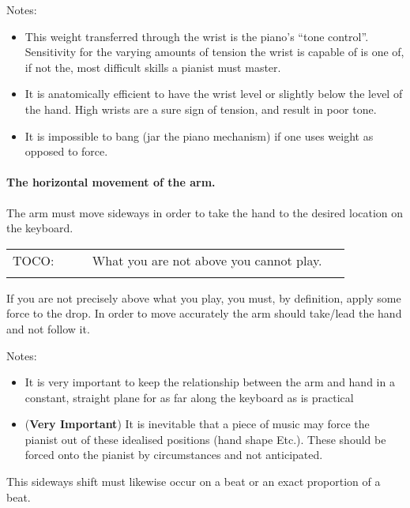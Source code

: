\documentclass{article}
\begin{document}
Notes:
\begin{itemize}
    \item This weight transferred through the wrist is the piano’s ``tone control''.
    Sensitivity for the varying amounts of tension the wrist is capable of is one of, if not the, most difficult skills a pianist must master.
    \item It is anatomically efficient to have the wrist level or slightly below the level of the hand.
        High wrists are a sure sign of tension, and result in poor tone.
    \item It is impossible to bang (jar the piano mechanism) if one uses weight as opposed to force.
\end{itemize}

\paragraph{The horizontal movement of the arm.\newline\newline}

The arm must move sideways in order to take the hand to the desired location on the keyboard.

\begin{tabular}{p{0.2\linewidth}p{0.65\linewidth}}
    \\
    TOCO: & What you are not above you cannot play.\\
    \\
\end{tabular}

If you are not precisely above what you play, you must, by definition, apply some force to the drop.
In order to move accurately the arm should take/lead the hand and not follow it.
\newline

Notes:
\begin{itemize}
    \item It is very important to keep the relationship between the arm and hand in a constant, straight plane for as far along the keyboard as is practical
    \item (\textbf{Very Important}) It is inevitable that a piece of music may force the pianist out of these idealised positions (hand shape Etc.).
        These should be forced onto the pianist by circumstances and not anticipated.
\end{itemize}

This sideways shift must likewise occur on a beat or an exact proportion of a beat.\footnotemark
\end{document}
